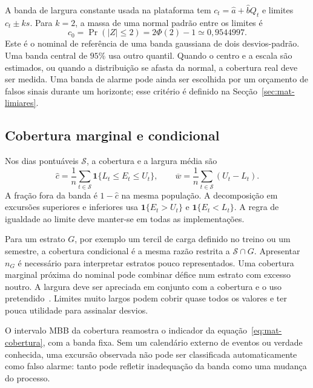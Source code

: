 A banda de largura constante usada na plataforma tem $c_t=\widehat a+\widehat bQ_t$ e limites $c_t\pm ks$. Para $k=2$, a massa de uma normal padrão entre os limites é
\begin{equation}
c_0=\Pr(|Z|\leq2)=2\Phi(2)-1\simeq0{,}9544997.
\label{eq:mat-dois-sigma}
\end{equation}
Este é o nominal de referência de uma banda gaussiana de dois desvios-padrão. Uma banda central de $95\%$ usa outro quantil. Quando o centro e a escala são estimados, ou quando a distribuição se afasta da normal, a cobertura real deve ser medida. Uma banda de alarme pode ainda ser escolhida por um orçamento de falsos sinais durante um horizonte; esse critério é definido na Secção~\ref{sec:mat-limiares}.

\subsection{Cobertura marginal e condicional}
\label{sec:mat-cobertura}
Nos dias pontuáveis $\mathcal S$, a cobertura e a largura média são
\begin{equation}
\widehat c=\frac1n\sum_{t\in\mathcal S}\mathbf1\{L_t\leq E_t\leq U_t\},
\qquad \overline w=\frac1n\sum_{t\in\mathcal S}(U_t-L_t).
\label{eq:mat-cobertura}
\end{equation}
A fração fora da banda é $1-\widehat c$ na mesma população. A decomposição em excursões superiores e inferiores usa $\mathbf1\{E_t>U_t\}$ e $\mathbf1\{E_t<L_t\}$. A regra de igualdade ao limite deve manter-se em todas as implementações.

Para um estrato $G$, por exemplo um tercil de carga definido no treino ou um semestre, a cobertura condicional é a mesma razão restrita a $\mathcal S\cap G$. Apresentar $n_G$ é necessário para interpretar estratos pouco representados. Uma cobertura marginal próxima do nominal pode combinar défice num estrato com excesso noutro. A largura deve ser apreciada em conjunto com a cobertura e o uso pretendido~\parencite{Gneiting2007}. Limites muito largos podem cobrir quase todos os valores e ter pouca utilidade para assinalar desvios.

O intervalo MBB da cobertura reamostra o indicador da equação~\ref{eq:mat-cobertura}, com a banda fixa. Sem um calendário externo de eventos ou verdade conhecida, uma excursão observada não pode ser classificada automaticamente como falso alarme: tanto pode refletir inadequação da banda como uma mudança do processo.

